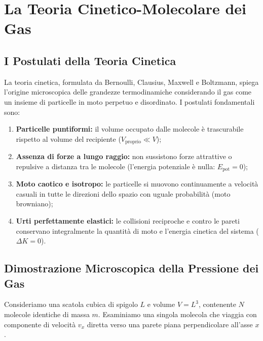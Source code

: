 \documentclass[11pt,a4paper,oneside]{report}
\begin{document}
\chapter{La Teoria Cinetico-Molecolare dei Gas}

\section{I Postulati della Teoria Cinetica}
La teoria cinetica, formulata da Bernoulli, Clausius, Maxwell e Boltzmann, spiega l'origine microscopica delle grandezze termodinamiche considerando il gas come un insieme di particelle in moto perpetuo e disordinato. I postulati fondamentali sono:
\begin{enumerate}
  \item \textbf{Particelle puntiformi:} il volume occupato dalle molecole è trascurabile rispetto al volume del recipiente ($V_{\text{proprio}} \ll V$);
  \item \textbf{Assenza di forze a lungo raggio:} non sussistono forze attrattive o repulsive a distanza tra le molecole (l'energia potenziale è nulla: $E_{\text{pot}} = 0$);
  \item \textbf{Moto caotico e isotropo:} le particelle si muovono continuamente a velocità casuali in tutte le direzioni dello spazio con uguale probabilità (moto browniano);
  \item \textbf{Urti perfettamente elastici:} le collisioni reciproche e contro le pareti conservano integralmente la quantità di moto e l'energia cinetica del sistema ($\Delta K = 0$).
\end{enumerate}

\section{Dimostrazione Microscopica della Pressione dei Gas}
Consideriamo una scatola cubica di spigolo $L$ e volume $V = L^3$, contenente $N$ molecole identiche di massa $m$.
Esaminiamo una singola molecola che viaggia con componente di velocità $v_x$ diretta verso una parete piana perpendicolare all'asse $x$.
\end{document}
